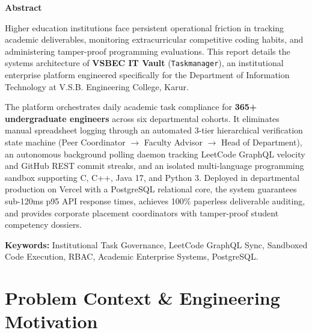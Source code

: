 \documentclass[12pt,a4paper]{report}
\begin{document}
\begin{center}
    {\Large \textbf{Abstract}}
\end{center}
\vspace{0.5cm}

Higher education institutions face persistent operational friction in tracking academic deliverables, monitoring extracurricular competitive coding habits, and administering tamper-proof programming evaluations. This report details the systems architecture of \textbf{VSBEC IT Vault} (\texttt{Taskmanager}), an institutional enterprise platform engineered specifically for the Department of Information Technology at V.S.B. Engineering College, Karur. 

The platform orchestrates daily academic task compliance for \textbf{365+ undergraduate engineers} across six departmental cohorts. It eliminates manual spreadsheet logging through an automated 3-tier hierarchical verification state machine (Peer Coordinator $\rightarrow$ Faculty Advisor $\rightarrow$ Head of Department), an autonomous background polling daemon tracking LeetCode GraphQL velocity and GitHub REST commit streaks, and an isolated multi-language programming sandbox supporting C, C++, Java 17, and Python 3. Deployed in departmental production on Vercel with a PostgreSQL relational core, the system guarantees sub-120ms p95 API response times, achieves 100\% paperless deliverable auditing, and provides corporate placement coordinators with tamper-proof student competency dossiers.

\vspace{0.8cm}
\noindent \textbf{Keywords:} Institutional Task Governance, LeetCode GraphQL Sync, Sandboxed Code Execution, RBAC, Academic Enterprise Systems, PostgreSQL.

\cleardoublepage
\tableofcontents

\cleardoublepage
{}
\setcounter{page}{1}

\chapter{Problem Context \& Engineering Motivation}
\end{document}
